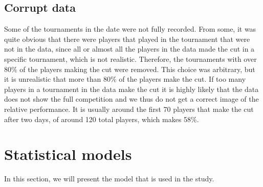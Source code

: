 \documentclass{article}\usepackage[]{graphicx}\usepackage[]{color}
\begin{document}
\subsection{Corrupt data}
Some of the tournaments in the date were not fully recorded. From some, it was quite obvious that there were players that played in the tournament that were not in the data, since all or almost all the players in the data made the cut in a specific tournament, which is not realistic. Therefore, the tournaments with over $80\%$ of the players making the cut were removed. This choice was arbitrary, but it is unrealistic that more than $80\%$ of the players make the cut. If too many players in a tournament in the data make the cut it is highly likely that the data does not show the full competition and we thus do not get a correct image of the relative performance. It is usually around the first 70 players that make the cut after two days, of around 120 total players, which makes 58\%.

\section{Statistical models}
In this section, we will present the model that is used in the study.
\end{document}

